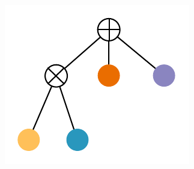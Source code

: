 \documentclass[final]{beamer}
\begin{document}
\begin{frame}{}
\begin{textblock}{60}
{\begin{minipage}[t]{6.48cm}
      \includegraphics[width=\linewidth]{figures/learnspn-2}
    \end{minipage}}\hspace{30pt}\begin{minipage}[t]{5.1516cm}

\end{minipage}
\end{textblock}
\end{frame}
\end{document}
